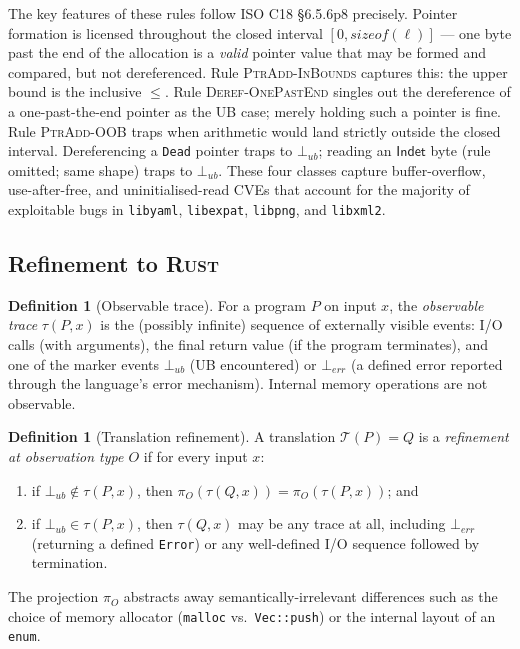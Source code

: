 \documentclass[12pt]{article}
\newcommand{\Loc}{\ell}
\newcommand{\UB}{\bot_{\mathit{ub}}}
\newcommand{\T}{\mathcal{T}}
\newcommand{\Indet}{\mathsf{Indet}}
\newcommand{\rust}{\textnormal{\textsc{Rust}}}
\newcommand{\libyaml}{\texttt{libyaml}}
\theoremstyle{definition}
\newtheorem{definition}[theorem]{Definition}
\theoremstyle{remark}
\begin{document}
The key features of these rules follow ISO C18 \S{}6.5.6p8 precisely. Pointer formation is licensed throughout the closed interval \([0, \mathit{sizeof}(\Loc)]\) --- one byte past the end of the allocation is a \emph{valid} pointer value that may be formed and compared, but not dereferenced. Rule \textsc{PtrAdd-InBounds} captures this: the upper bound is the inclusive \(\leq\). Rule \textsc{Deref-OnePastEnd} singles out the dereference of a one-past-the-end pointer as the UB case; merely holding such a pointer is fine. Rule \textsc{PtrAdd-OOB} traps when arithmetic would land strictly outside the closed interval. Dereferencing a \texttt{Dead} pointer traps to \(\UB\); reading an \(\Indet\) byte (rule omitted; same shape) traps to \(\UB\). These four classes capture buffer-overflow, use-after-free, and uninitialised-read CVEs that account for the majority of exploitable bugs in \libyaml{}, \texttt{libexpat}, \texttt{libpng}, and \texttt{libxml2}.

\subsection{Refinement to \rust{}}
\begin{definition}[Observable trace]
\label{def:trace}
For a program \(P\) on input \(x\), the \emph{observable trace} \(\tau(P, x)\) is the (possibly infinite) sequence of externally visible events: I/O calls (with arguments), the final return value (if the program terminates), and one of the marker events \(\bot_{\mathit{ub}}\) (UB encountered) or \(\bot_{\mathit{err}}\) (a defined error reported through the language's error mechanism). Internal memory operations are not observable.
\end{definition}

\begin{definition}[Translation refinement]
\label{def:refines}
A translation \(\T(P) = Q\) is a \emph{refinement at observation type \(O\)} if for every input \(x\):
\begin{enumerate}
\item if \(\bot_{\mathit{ub}} \notin \tau(P, x)\), then \(\pi_{O}(\tau(Q, x)) = \pi_{O}(\tau(P, x))\); and
\item if \(\bot_{\mathit{ub}} \in \tau(P, x)\), then \(\tau(Q, x)\) may be any trace at all, including \(\bot_{\mathit{err}}\) (returning a defined \texttt{Error}) or any well-defined I/O sequence followed by termination.
\end{enumerate}
The projection \(\pi_O\) abstracts away semantically-irrelevant differences such as the choice of memory allocator (\texttt{malloc} vs.\ \texttt{Vec::push}) or the internal layout of an \texttt{enum}.
\end{definition}
\end{document}

